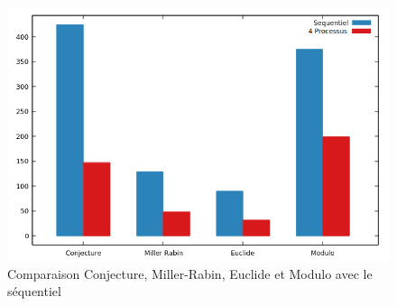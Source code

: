 	\begin{frame}
	\begin{figure}[!ht]	
		\begin{center}\includegraphics[scale=0.4]{Bar1.png}\end{center}
		\caption{Comparaison Conjecture, Miller-Rabin, Euclide et Modulo avec le séquentiel}
		\label{fg:fig3}
	\end{figure}	
	\end{frame}
	
